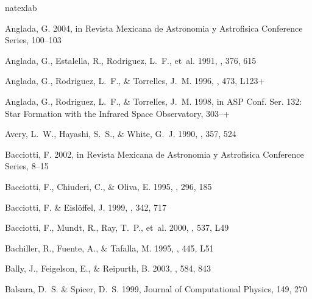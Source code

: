 \documentclass{aa}
\begin{document}
\begin{thebibliography}{80}
\expandafter\ifx\csname natexlab\endcsname\relax\def\natexlab#1{#1}\fi

{Anglada}, G. 2004, in Revista Mexicana de Astronomia y Astrofisica Conference
  Series, 100--103

{Anglada}, G., {Estalella}, R., {Rodriguez}, L.~F., {et~al.} 1991, \apj, 376,
  615

{Anglada}, G., {Rodriguez}, L.~F., \& {Torrelles}, J.~M. 1996, \apjl, 473,
  L123+

{Anglada}, G., {Rodriguez}, L.~F., \& {Torrelles}, J.~M. 1998, in ASP Conf.
  Ser. 132: Star Formation with the Infrared Space Observatory, 303--+

{Avery}, L.~W., {Hayashi}, S.~S., \& {White}, G.~J. 1990, \apj, 357, 524

{Bacciotti}, F. 2002, in Revista Mexicana de Astronomia y Astrofisica
  Conference Series, 8--15

{Bacciotti}, F., {Chiuderi}, C., \& {Oliva}, E. 1995, \aap, 296, 185

{Bacciotti}, F. \& {Eisl{\" o}ffel}, J. 1999, \aap, 342, 717

{Bacciotti}, F., {Mundt}, R., {Ray}, T.~P., {et~al.} 2000, \apjl, 537, L49

{Bachiller}, R., {Fuente}, A., \& {Tafalla}, M. 1995, \apjl, 445, L51

{Bally}, J., {Feigelson}, E., \& {Reipurth}, B. 2003, \apj, 584, 843

Balsara, D.~S. \& Spicer, D.~S. 1999, Journal of Computational Physics, 149,
  270


\end{thebibliography}
\end{document}
